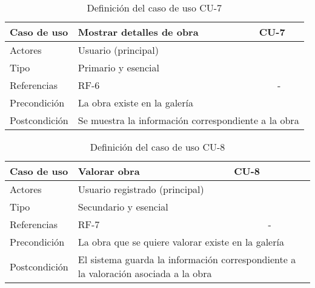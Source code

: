 \begin{table}[H]
    \begin{tabular}{|p{3cm}|p{5cm}|p{2cm}|}
        \hline
        Caso de uso & Mostrar detalles de obra & CU-7 \\
        \hline
        Actores & \multicolumn{2}{|p{7cm}|}{Usuario (principal)} \\
        \hline
        Tipo & \multicolumn{2}{|p{7cm}|}{Primario y esencial} \\
        \hline
        Referencias & RF-6 & \multicolumn{1}{|c|}{-} \\
        \hline
        Precondición & \multicolumn{2}{|p{7cm}|}{La obra existe en la galería} \\
        \hline
        Postcondición & \multicolumn{2}{|p{7cm}|}{Se muestra la información
        correspondiente a la obra} \\
        \hline
    \end{tabular}
    \caption{Definición del caso de uso CU-7}
    \label{tab:cu_7}
\end{table}

\begin{table}[H]
    \begin{tabular}{|p{3cm}|p{5cm}|p{2cm}|}
        \hline
        Caso de uso & Valorar obra & CU-8 \\
        \hline
        Actores & \multicolumn{2}{|p{7cm}|}{Usuario registrado (principal)} \\
        \hline
        Tipo & \multicolumn{2}{|p{7cm}|}{Secundario y esencial} \\
        \hline
        Referencias & RF-7 & \multicolumn{1}{|c|}{-} \\
        \hline
        Precondición & \multicolumn{2}{|p{7cm}|}{La obra que se quiere valorar
        existe en la galería} \\
        \hline
        Postcondición & \multicolumn{2}{|p{7cm}|}{El sistema guarda la información
        correspondiente a la valoración asociada a la obra} \\
        \hline
    \end{tabular}
    \caption{Definición del caso de uso CU-8}
    \label{tab:cu_8}
\end{table}

